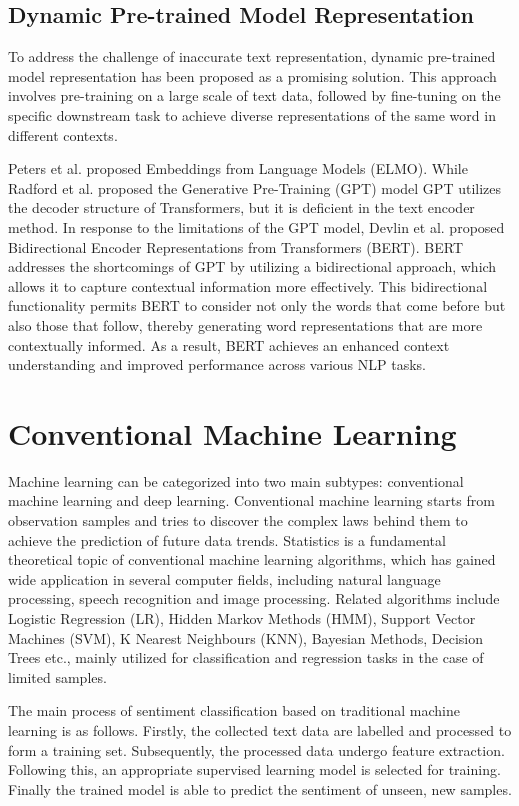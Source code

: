\documentclass[ %
                    author={Bocheng Wang},
                supervisor={Dr. Qiang Liu},
                    degree={MSc},
                     title={A Research on Identification of Suicide Ideation in Texts with Multiple Models},
                      type={},
                      year={2024}]{dissertation}
\begin{document}
\subsection{Dynamic Pre-trained Model Representation}
\noindent
To address the challenge of inaccurate text representation, dynamic pre-trained model representation has been proposed as a promising solution. This approach involves pre-training on a large scale of text data, followed by fine-tuning on the specific downstream task to achieve diverse representations of the same word in different contexts. 

Peters et al.\cite{peters2018deep} proposed Embeddings from Language Models (ELMO). While Radford et al.\cite{radford2018improving} proposed the Generative Pre-Training (GPT) model GPT utilizes the decoder structure of Transformers\cite{vaswani2017attention}, but it is deficient in the text encoder method. In response to the limitations of the GPT model, Devlin et al.\cite{devlin2018bert} proposed Bidirectional Encoder Representations from Transformers (BERT). BERT addresses the shortcomings of GPT by utilizing a bidirectional approach, which allows it to capture contextual information more effectively. This bidirectional functionality permits BERT to consider not only the words that come before but also those that follow, thereby generating word representations that are more contextually informed. As a result, BERT achieves an enhanced context understanding and improved performance across various NLP tasks.

\section{Conventional Machine Learning}
\noindent
Machine learning can be categorized into two main subtypes: conventional machine learning and deep learning. Conventional machine learning starts from observation samples and tries to discover the complex laws behind them to achieve the prediction of future data trends. Statistics is a fundamental theoretical topic of conventional machine learning algorithms, which has gained wide application in several computer fields, including natural language processing, speech recognition and image processing. Related algorithms include Logistic Regression (LR), Hidden Markov Methods (HMM), Support Vector Machines (SVM), K Nearest Neighbours (KNN), Bayesian Methods, Decision Trees etc., mainly utilized for classification and regression tasks in the case of limited samples.

The main process of sentiment classification based on traditional machine learning is as follows. Firstly, the collected text data are labelled and processed to form a training set. Subsequently, the processed data undergo feature extraction. Following this, an appropriate supervised learning model is selected for training. Finally the trained model is able to predict the sentiment of unseen, new samples.
\end{document}
